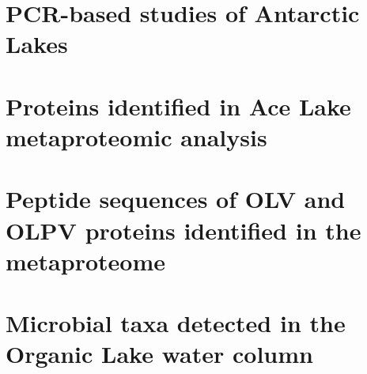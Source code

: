 \setcounter{secnumdepth}{1}
\begin{appendices}

\chapter{PCR-based studies of Antarctic Lakes}
\label{app:A}



\chapter{Proteins identified in Ace Lake metaproteomic analysis}
\label{app:B}







\chapter{Peptide sequences of OLV and OLPV proteins identified in the metaproteome} 
\label{app:C}
\newpage


\chapter{Microbial taxa detected in the Organic Lake water column} 
\label{app:D}



\end{appendices}
